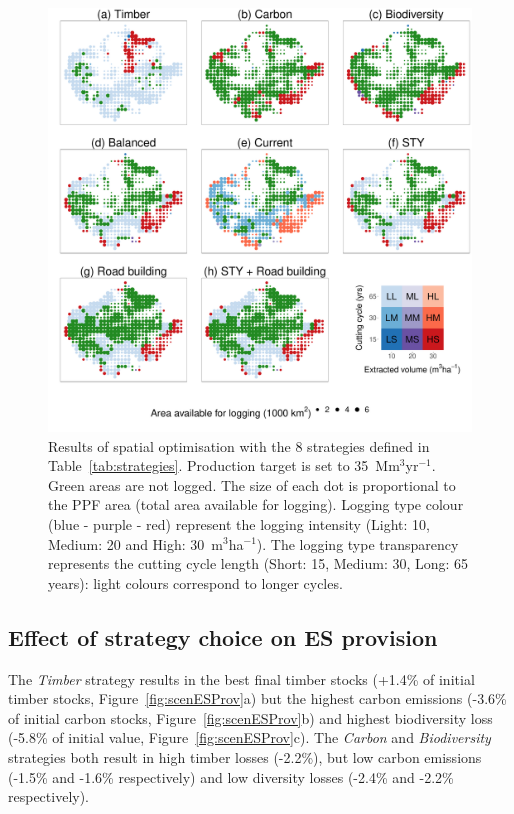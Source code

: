 \documentclass{article}
\begin{document}
\begin{figure}
    \centering
    \includegraphics[width=0.8\linewidth]{graphs/mapsScenarios.pdf}
    \caption{Results of spatial optimisation with the 8 strategies defined in Table~\ref{tab:strategies}. Production target is set to 35~Mm$^3$yr$^{-1}$. Green areas are not logged. The size of each dot is proportional to the PPF area (total area available for logging). Logging type colour (blue - purple - red) represent the logging intensity (Light: 10, Medium: 20 and High: 30~m$^3$ha$^{-1}$). The logging type transparency represents the cutting cycle length (Short: 15, Medium: 30, Long: 65 years): light colours correspond to longer cycles.}
    \label{fig:mapsStrateg}
\end{figure}

\subsection{Effect of strategy choice on ES provision}

The \textit{Timber} strategy results in the best final timber stocks (+1.4\% of initial timber stocks, Figure~\ref{fig:scenESProv}a) but the highest carbon emissions (-3.6\% of initial carbon stocks, Figure~\ref{fig:scenESProv}b) and highest biodiversity loss (-5.8\% of initial value, Figure~\ref{fig:scenESProv}c). The \textit{Carbon} and \textit{Biodiversity} strategies both result in high timber losses (-2.2\%), but low carbon emissions (-1.5\% and -1.6\% respectively) and low diversity losses (-2.4\% and -2.2\% respectively). 
\end{document}
